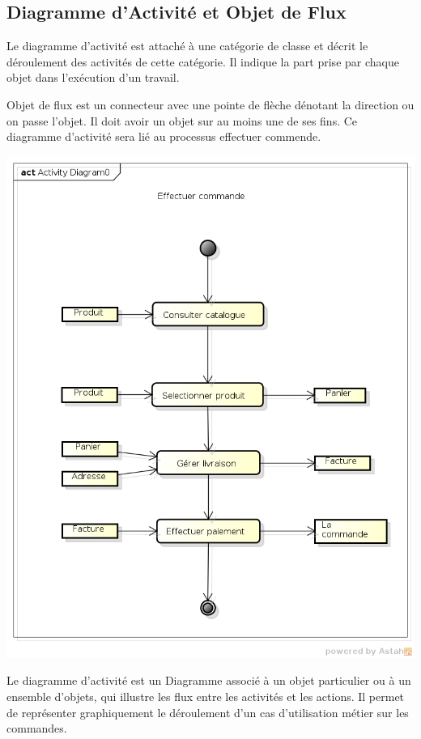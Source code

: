 \subsection{Diagramme d'Activité et Objet de Flux}

Le diagramme d’activité est attaché à une catégorie de classe et décrit le déroulement des activités de cette catégorie. Il indique la part prise par chaque objet dans
l’exécution d’un travail.

Objet de flux est un connecteur avec une pointe de flèche dénotant la direction ou on passe l’objet. Il doit avoir un objet sur au moins une de ses fins. 
Ce diagramme d'activité sera lié au processus effectuer commende.



\begin{minipage}{1\textwidth}
	\includegraphics[width=0.7\linewidth]{mama/images/Effectuer}
	\label{fig:Effectuer}
\end{minipage}

Le diagramme d’activité est un Diagramme associé à un objet particulier ou à un ensemble d’objets, qui illustre les flux entre les activités et les actions. Il permet de représenter graphiquement le déroulement d’un cas d’utilisation métier sur les commandes.



